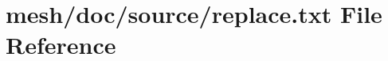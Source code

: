 \hypertarget{mesh_2doc_2source_2replace_8txt}{}\section{mesh/doc/source/replace.txt File Reference}
\label{mesh_2doc_2source_2replace_8txt}
